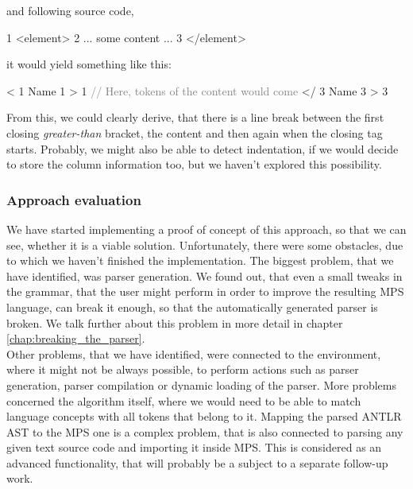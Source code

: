 \noindent
and following source code,

\begin{antlr}
	1   <element>
	2      ... some content ...
	3   </element>
\end{antlr}

\noindent
it would yield something like this:

\begin{antlr}
	<       1
	Name    1
	>       1
	\textcolor{gray}{// Here, tokens of the content would come}
	</      3
	Name    3
	>       3
\end{antlr}

From this, we could clearly derive, that there is a line break between the first closing \textit{greater-than} bracket, the content and then again when the closing tag starts.
Probably, we might also be able to detect indentation, if we would decide to store the column information too, but we haven't explored this possibility.

\subsubsection{Approach evaluation}

We have started implementing a proof of concept of this approach, so that we can see, whether it is a viable solution.
Unfortunately, there were some obstacles, due to which we haven't finished the implementation.
The biggest problem, that we have identified, was parser generation.
We found out, that even a small tweaks in the grammar, that the user might perform in order to improve the resulting MPS language, can break it enough, so that the automatically generated parser is broken.
We talk further about this problem in more detail in chapter \ref{chap:breaking_the_parser}.
\\

Other problems, that we have identified, were connected to the environment, where it might not be always possible, to perform actions such as parser generation, parser compilation or dynamic loading of the parser.
More problems concerned the algorithm itself, where we would need to be able to match language concepts with all tokens that belong to it.
Mapping the parsed ANTLR AST to the MPS one is a complex problem, that is also connected to parsing any given text source code and importing it inside MPS.
This is considered as an advanced functionality, that will probably be a subject to a separate follow-up work.
\\

